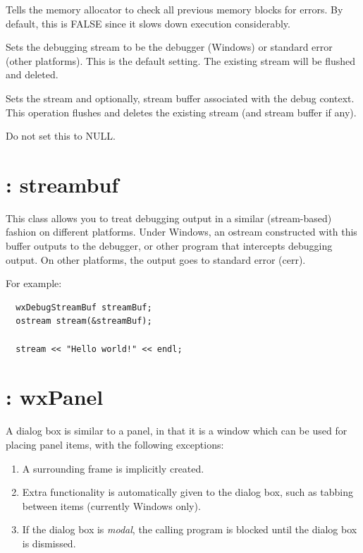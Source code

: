 Tells the memory allocator to check all previous memory blocks for errors.
By default, this is FALSE since it slows down execution considerably.



Sets the debugging stream to be the debugger (Windows) or standard error (other platforms).
This is the default setting. The existing stream will be flushed and deleted.



Sets the stream and optionally, stream buffer associated with the debug context.
This operation flushes and deletes the existing stream (and stream buffer if any).

Do not set this to NULL.


\section{: streambuf}\label{wxdebugstreambuf}

This class allows you to treat debugging output in a similar
(stream-based) fashion on different platforms. Under
Windows, an ostream constructed with this buffer outputs
to the debugger, or other program that intercepts debugging
output. On other platforms, the output goes to standard error (cerr).

For example:

\begin{verbatim}
  wxDebugStreamBuf streamBuf;
  ostream stream(&streamBuf);

  stream << "Hello world!" << endl;
\end{verbatim}


\section{: wxPanel}\label{wxdialogbox}


A dialog box is similar to a panel, in that it is a window which can
be used for placing panel items, with the following exceptions:

\begin{enumerate}
\item A surrounding frame is implicitly created.
\item Extra functionality is automatically given to the dialog box,
  such as tabbing between items (currently Windows only).
\item If the dialog box is {\it modal}, the calling program is blocked
  until the dialog box is dismissed.
\end{enumerate}

